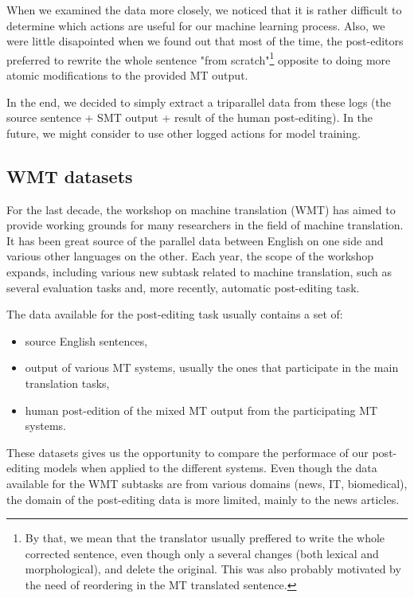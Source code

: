 When we examined the data more closely,
we noticed that it is rather difficult to determine which actions are
useful for our machine learning process. Also, we were little disapointed
when we found out that most of the time, the post-editors preferred to
rewrite the whole sentence "from scratch"\footnote{By that, we mean that the
translator usually preffered to write the whole corrected sentence, even though
only a several changes (both lexical and morphological), and delete the original.
This was also probably motivated by the need of reordering in the MT translated
sentence.} opposite to doing more atomic modifications to the provided MT output.

In the end, we decided to simply extract a triparallel data from these logs (the source
sentence + SMT output + result of the human post-editing). In the future,
we might consider to use other logged actions for model training.

\subsection{WMT datasets}

For the last decade, the workshop on machine translation (WMT) has aimed
to provide working grounds for many researchers in the field of machine
translation. It has been great source of the parallel data between English
on one side and various other languages on the other. Each year, the scope
of the workshop expands, including various new subtask related to machine translation,
such as several evaluation tasks and, more recently, automatic post-editing task.

The data available for the post-editing task usually contains a set of:
\begin{itemize}
    \item source English sentences,
    \item output of various MT systems, usually the ones that participate in the main
translation tasks,
    \item human post-edition of the mixed MT output from the participating MT systems.
\end{itemize}

These datasets gives us the opportunity to compare the performace of our post-editing
models when applied to the different systems. Even though the data available for the
WMT subtasks are from various domains (news, IT, biomedical), the domain of the post-editing
data is more limited, mainly to the news articles.

